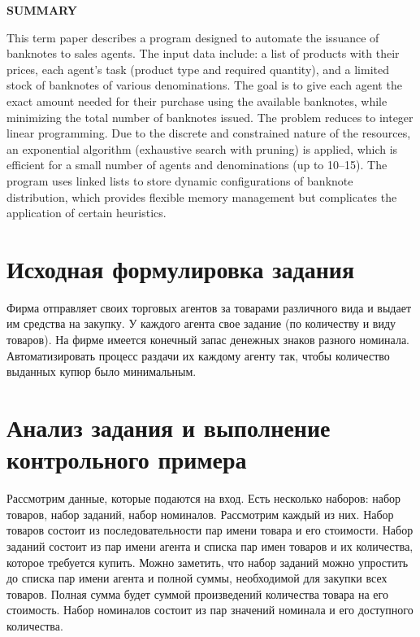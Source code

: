 \documentclass[12pt]{extarticle}
\begin{document}
\vfill

\centering \textbf{SUMMARY}

\justifying
This term paper describes a program designed to automate the issuance of banknotes to sales agents. The input data include: a list of products with their prices, each agent’s task (product type and required quantity), and a limited stock of banknotes of various denominations. The goal is to give each agent the exact amount needed for their purchase using the available banknotes, while minimizing the total number of banknotes issued. The problem reduces to integer linear programming. Due to the discrete and constrained nature of the resources, an exponential algorithm (exhaustive search with pruning) is applied, which is efficient for a small number of agents and denominations (up to 10–15). The program uses linked lists to store dynamic configurations of banknote distribution, which provides flexible memory management but complicates the application of certain heuristics.

\pagebreak

\centering \tableofcontents \justifying

\pagebreak

\section{Исходная формулировка задания}
Фирма отправляет своих торговых агентов за товарами различного вида и выдает им средства на закупку. У каждого агента свое задание (по количеству и виду товаров). На фирме имеется конечный запас денежных знаков разного номинала. Автоматизировать процесс раздачи их каждому агенту так, чтобы количество выданных купюр было минимальным.

\section{Анализ задания и выполнение контрольного примера}

Рассмотрим данные, которые подаются на вход. Есть несколько наборов: набор товаров, набор заданий, набор номиналов. Рассмотрим каждый из них. Набор товаров состоит из последовательности пар имени товара и его стоимости. Набор заданий состоит из пар имени агента и списка пар имен товаров и их количества, которое требуется купить. Можно заметить, что набор заданий можно упростить до списка пар имени агента и полной суммы, необходимой для закупки всех товаров. Полная сумма будет суммой произведений количества товара на его стоимость. Набор номиналов состоит из пар значений номинала и его доступного количества.
\end{document}
